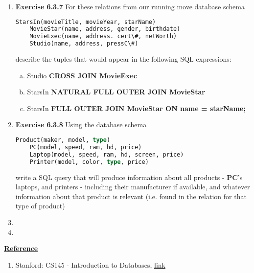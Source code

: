 \documentclass[12pt]{article}
\begin{document}
\begin{enumerate}[1.]
    \item \textbf{Exercise 6.3.7} For these relations from our running move database
    schema

    \begin{lstlisting}[language=SQL]
    StarsIn(movieTitle, movieYear, starName)
    MovieStar(name, address, gender, birthdate)
    MovieExec(name, address. cert\#, netWorth)
    Studio(name, address, pressC\#)
    \end{lstlisting}

    \bigskip

    describe the tuples that would appear in the following SQL expressions:

    \begin{enumerate}[a)]
        \item Studio \textbf{CROSS JOIN MovieExec}
        \item StarsIn \textbf{NATURAL FULL OUTER JOIN MovieStar}
        \item StarsIn \textbf{FULL OUTER JOIN MovieStar ON name = starName;}
    \end{enumerate}

    \item \textbf{Exercise 6.3.8} Using the database schema

    \begin{lstlisting}[language=SQL]
    Product(maker, model, type)
    PC(model, speed, ram, hd, price)
    Laptop(model, speed, ram, hd, screen, price)
    Printer(model, color, type, price)
    \end{lstlisting}

    \bigskip

    write a SQL query that will produce information about all products - \textbf{PC}'s
    laptops, and printers - including their manufacturer if available, and whatever
    information about that product is relevant (i.e. found in the relation
    for that type of product)

    \item

    \item


\end{enumerate}

\bigskip

\underline{\textbf{Reference}}

\bigskip

\begin{enumerate}[1)]
    \item Stanford: CS145 - Introduction to Databases, \href{http://infolab.stanford.edu/~ullman/fcdb/aut07/index.html}{link}
\end{enumerate}
\end{document}
